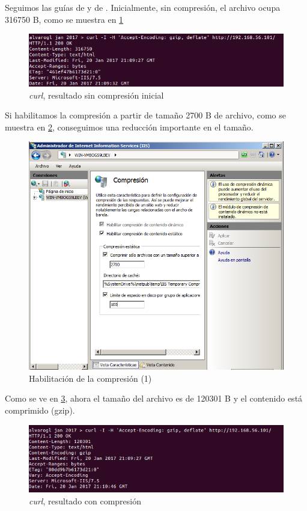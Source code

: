 Seguimos las guías de \cite{configcompr} y de \cite{curl}.
Inicialmente, sin compresión, el archivo ocupa 316750 B, como se muestra en \ref{12}

\begin{figure}[H]
	\centering
	\includegraphics[scale=0.6]{12.png}
	\caption{\textit{curl}, resultado sin compresión inicial} \label{12}
\end{figure}

Si habilitamos la compresión a partir de tamaño 2700 B de archivo, como se muestra en \ref{14}, conseguimos una reducción importante en el tamaño.

\begin{figure}[H]
	\centering
	\includegraphics[scale=0.45]{14.png}
	\caption{Habilitación de la compresión (1) } \label{14}
\end{figure}

Como se ve en \ref{13}, ahora el tamaño del archivo es de 120301 B y el contenido está comprimido (gzip).

\begin{figure}[H]
	\centering
	\includegraphics[scale=0.6]{13.png}
	\caption{\textit{curl}, resultado con compresión} \label{13}
\end{figure}

